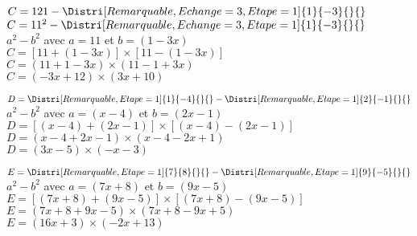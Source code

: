 \begin{corrige}
\begin{enumerate}
        \setcounter{enumi}{2}
        \begin{itemize}
            \def\item{}
            \begin{spacing}{1.2}
                \item $C= 121- \Distri[Remarquable,Echange=3,Etape=1]{1}{-3}{}{}$\\
                {\red 
                $C = 11^2- \Distri[Remarquable,Echange=3,Etape=1]{1}{-3}{}{}$\\
                $a^2-b^2$ avec $a=11$ et $b=(1-3x)$\\
                $C = [11+(1-3x)]\times [11-(1-3x)]$\\
                $C = (11+1-3x)\times (11-1+3x)$\\
                $C = (-3x+12)\times (3x+10)$
                }
                
                \medskip
                \item $D= \Distri[Remarquable,Etape=1]{1}{-4}{}{} - \Distri[Remarquable,Etape=1]{2}{-1}{}{}$\\
                {\red                 
                $a^2-b^2$ avec $a=(x-4)$ et $b=(2x-1)$\\
                $D = [(x-4)+(2x-1)]\times [(x-4)-(2x-1)]$\\
                $D = (x-4+2x-1)\times (x-4-2x+1)$\\
                $D = (3x-5)\times (-x-3)$
                }
                
                \medskip
                \item $E= \Distri[Remarquable,Etape=1]{7}{8}{}{} -  \Distri[Remarquable,Etape=1]{9}{-5}{}{}$\\
                {\red                 
                $a^2-b^2$ avec $a=(7x+8)$ et $b=(9x-5)$\\
                $E = [(7x+8)+(9x-5)]\times [(7x+8)-(9x-5)]$\\
                $E = (7x+8+9x-5)\times (7x+8-9x+5)$\\
                $E = (16x+3)\times (-2x+13)$
                }


\end{spacing}
\end{itemize}
\end{enumerate}
\end{corrige}

